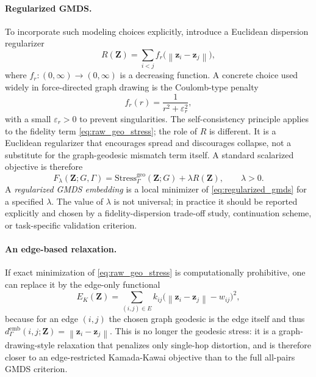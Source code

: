 \documentclass[twoside,11pt]{article}
\newcommand{\bz}{\mathbf{z}}
\newcommand{\bZ}{\mathbf{Z}}
\newcommand{\norm}[1]{\left\|#1\right\|}
\newcommand{\demb}{d^{\mathrm{emb}}}
\newcommand{\Stress}{\mathrm{Stress}}
\begin{document}
\paragraph{Regularized GMDS.}
To incorporate such modeling choices explicitly, introduce a Euclidean
dispersion regularizer
\begin{equation}
  R(\bZ) = \sum_{i < j} f_r\bigl(\norm{\bz_i - \bz_j}\bigr),
  \label{eq:repulsive_regularizer}
\end{equation}
where $f_r : (0,\infty) \to (0,\infty)$ is a decreasing function.  A
concrete choice used widely in force-directed graph drawing is the Coulomb-type
penalty
\begin{equation}
  f_r(r) = \frac{1}{r^2 + \varepsilon_r^2},
  \label{eq:coulomb_regularizer}
\end{equation}
with a small $\varepsilon_r > 0$ to prevent singularities.  The
self-consistency principle applies to the fidelity term
\cref{eq:raw_geo_stress}; the role of $R$ is different.  It is a Euclidean
regularizer that encourages spread and discourages collapse, not a substitute
for the graph-geodesic mismatch term itself.  A standard scalarized objective
is therefore
\begin{equation}
  F_\lambda(\bZ; G,\Gamma)
  = \Stress^{\mathrm{geo}}_{\Gamma}(\bZ; G) + \lambda R(\bZ),
  \qquad \lambda > 0.
  \label{eq:regularized_gmds}
\end{equation}
A \emph{regularized GMDS embedding} is a local minimizer of
\cref{eq:regularized_gmds} for a specified $\lambda$.  The value of
$\lambda$ is not universal; in practice it should be reported explicitly and
chosen by a fidelity-dispersion trade-off study, continuation scheme, or
task-specific validation criterion.

\paragraph{An edge-based relaxation.}
If exact minimization of \cref{eq:raw_geo_stress} is computationally
prohibitive, one can replace it by the edge-only functional
\begin{equation}
  E_K(\bZ)
  = \sum_{(i,j) \in E} k_{ij}\bigl(\norm{\bz_i - \bz_j} - w_{ij}\bigr)^2,
  \label{eq:edge_relaxation}
\end{equation}
because for an edge $(i,j)$ the chosen graph geodesic is the edge itself and
thus $\demb_{\Gamma}(i,j;\bZ) = \norm{\bz_i - \bz_j}$.  This is no longer the
geodesic stress: it is a graph-drawing-style relaxation that penalizes only
single-hop distortion, and is therefore closer to an edge-restricted
Kamada-Kawai objective \citep{kamada1989algorithm, fruchterman1991graph}
than to the full all-pairs GMDS criterion.
\end{document}
